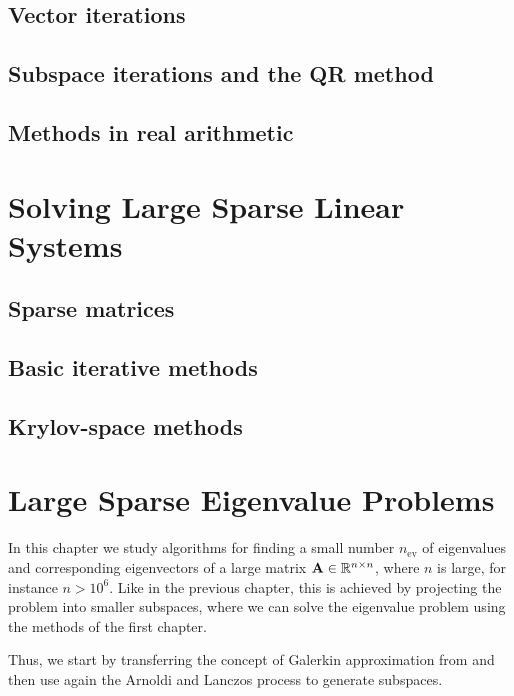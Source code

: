 \section{Vector iterations}


\section{Subspace iterations and the QR method}


\section{Methods in real arithmetic}


%

\chapter{Solving Large Sparse Linear Systems}

\section{Sparse matrices}



\section{Basic iterative methods}


\section{Krylov-space methods}


\chapter{Large Sparse Eigenvalue Problems}

\begin{intro}
  In this chapter we study algorithms for finding a small number
  $n_{\text{ev}}$ of eigenvalues and corresponding eigenvectors of a
  large matrix $\mathbf A\in\mathbb R^{n\times n}$, where $n$ is large, for instance
  $n>10^6$. Like in the previous chapter, this is achieved by
  projecting the problem into smaller subspaces, where we can solve
  the eigenvalue problem using the methods of the first chapter.

  Thus, we start by transferring the concept of Galerkin approximation
  from  and then use again the
  Arnoldi and Lanczos process to generate subspaces.
\end{intro}

